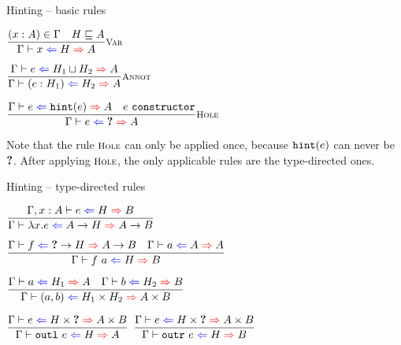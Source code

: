 \documentclass{beamer}
\newcommand{\Fun}[2]{#1 \to #2}
\newcommand{\Prod}[2]{#1 \times #2}
\newcommand{\annot}[2]{(#1 : #2)}
\newcommand{\fun}[2]{\lambda #1. #2}
\newcommand{\app}[2]{#1\ #2}
\newcommand{\pair}[2]{(#1, #2)}
\newcommand{\outl}[1]{\texttt{outl}\ #1}
\newcommand{\outr}[1]{\texttt{outr}\ #1}
\newcommand{\rulename}[1]{\textsc{\footnotesize{#1}}}
\newcommand{\infrule}[3][]{\displaystyle \frac{#2}{#3} \rulename{#1}}
\newcommand{\extend}[3]{#1, #2 : #3}
\newcommand{\sidecond}[1]{#1}
\begin{document}
\begin{frame}{Hinting -- basic rules}

\begin{center}
  $\infrule[Var]{\sidecond{(x : A) \in \Gamma} \quad \sidecond{\hintorder{H}{A}}}{\hinting{x}{H}{A}}$

  \vspace{2em}

  $\infrule[Annot]{\hinting{e}{\combinehints{H_1}{H_2}}{A}}{\hinting{\annot{e}{H_1}}{H_2}{A}}$

  \vspace{2em}

  $\infrule[Hole]{\hinting{e}{\hintfor{e}}{A} \quad \sidecond{e\ \texttt{constructor}}}{\hinting{e}{\Hole}{A}}$
\end{center}

\vspace{2em}

Note that the rule $\rulename{Hole}$ can only be applied once, because $\texttt{hint}(e)$ can never be $\textbf{?}$. After applying $\rulename{Hole}$, the only applicable rules are the type-directed ones.

\end{frame}

\begin{frame}{Hinting -- type-directed rules}

\begin{center}
  $\infrule{\fullhinting{\extend{\Gamma}{x}{A}}{e}{H}{B}}{\hinting{\fun{x}{e}}{\Fun{A}{H}}{\Fun{A}{B}}}$

  \vspace{1em}

  $\infrule{\hinting{f}{\Fun{\Hole}{H}}{\Fun{A}{B}} \quad \hinting{a}{A}{A}}{\hinting{\app{f}{a}}{H}{B}}$

  \vspace{1em}

  $\infrule{\hinting{a}{H_1}{A} \quad \hinting{b}{H_2}{B}}{\hinting{\pair{a}{b}}{\Prod{H_1}{H_2}}{\Prod{A}{B}}}$

  \vspace{1em}

  $\infrule{\hinting{e}{\Prod{H}{\Hole}}{\Prod{A}{B}}}{\hinting{\outl{e}}{H}{A}}$ \quad
  $\infrule{\hinting{e}{\Prod{H}{\Hole}}{\Prod{A}{B}}}{\hinting{\outr{e}}{H}{B}}$
\end{center}

\end{frame}
\end{document}
